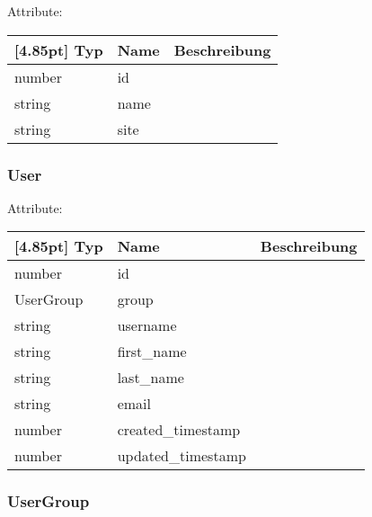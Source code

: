     		Attribute:
                \begin{center}
                	\renewcommand{\arraystretch}{1.5}
    	            \setlength\tabcolsep{5pt}
                	\begin{tabularx}{\textwidth}{|l|l|X|}
                		\hline
                        \rowcolor[gray]{0.75}[4.85pt]
                	    Typ & Name & Beschreibung \\ \hline
                		number & id &  \\ \hline
                		string & name &  \\ \hline
                		string & site &  \\ \hline
                	\end{tabularx}
                \end{center}
                
    		\subsubsection{User}
    		
    		Attribute:
                \begin{center}
                	\renewcommand{\arraystretch}{1.5}
    	            \setlength\tabcolsep{5pt}
                	\begin{tabularx}{\textwidth}{|l|l|X|}
                		\hline
                        \rowcolor[gray]{0.75}[4.85pt]
                	    Typ & Name & Beschreibung \\ \hline
                		number & id &  \\ \hline
                		UserGroup & group &  \\ \hline
                		string & username &  \\ \hline
                		string & first_name &  \\ \hline
                		string & last_name &  \\ \hline
                		string & email &  \\ \hline
                		number & created_timestamp &  \\ \hline
                		number & updated_timestamp &  \\ \hline
                	\end{tabularx}
                \end{center}
                
    		\subsubsection{UserGroup}
    		
